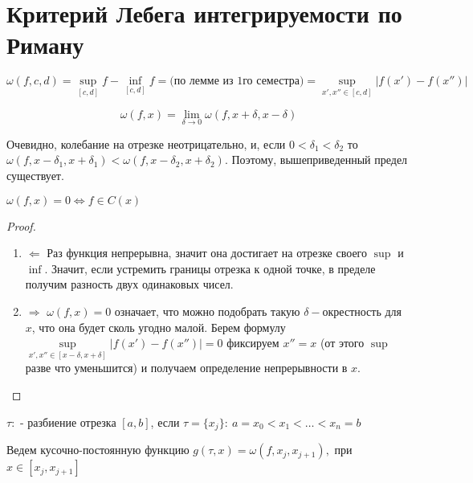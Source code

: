 \section{Критерий Лебега интегрируемости по Риману}

\begin{definition}
	\[ \omega(f, c, d) = \sup\limits_{[c, d]} f - \inf\limits_{[c, d]} f =
    \text{(по лемме из 1го семестра)}  = \sup\limits_{x',x'' \in [c,d]} | f(x') - f(x'') |\]
\end{definition}

\begin{definition}
	\[ \omega(f, x) = \lim\limits_{\delta \rightarrow 0} \omega(f, x + \delta, x - \delta)\]
\end{definition}

Очевидно, колебание на отрезке неотрицательно, и, если $0 < \delta_1 < \delta_2$
то $\omega(f, x - \delta_1, x + \delta_1) < \omega(f, x - \delta_2, x + \delta_2)$.
Поэтому, вышеприведенный предел существует.

\begin{statement}
    $\omega(f, x) = 0 \Leftrightarrow f \in C(x)$
\end{statement}

\begin{proof}
	\begin{enumerate}
		\item $\Leftarrow$ Раз функция непрерывна, значит она достигает на отрезке своего $\sup$ и $\inf$.
            Значит, если устремить границы отрезка к одной точке, в пределе получим разность двух одинаковых чисел.
		\item $\Rightarrow$ $\omega(f, x) = 0$ означает, что можно подобрать такую $\delta-$окрестность для $x$,
            что она будет сколь угодно малой. Берем формулу $\sup\limits_{x',x'' \in [x - \delta,x + \delta]} | f(x') - f(x'') | = 0$
            фиксируем $x'' = x$ (от этого $\sup$ разве что уменьшится) и получаем определение непрерывности в $x$.
	\end{enumerate}
\end{proof}

\begin{definition}
$\tau:$ - разбиение отрезка $[a, b]$, если $\tau = \{x_j\}: \: a = x_0 < x_1 < \dots < x_n = b$
\end{definition}

Ведем кусочно-постоянную функцию $g(\tau, x) = \omega(f, x_j, x_{j + 1}),$ при $x \in [x_j, x_{j + 1}]$

